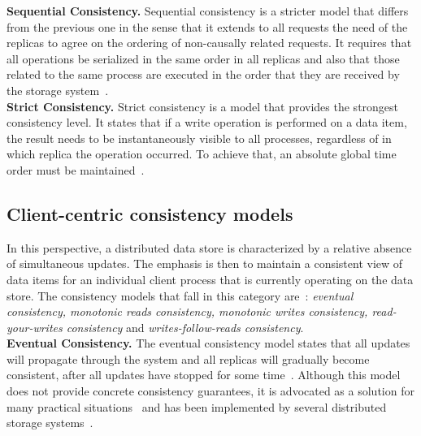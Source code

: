 \noindent \textbf{Sequential Consistency.}
Sequential consistency is a stricter model that differs from the previous one in the sense that it extends to all requests the need of the replicas to agree on the ordering of non-causally related requests. It requires  that all operations be serialized in the same order in all replicas and also that those related to the same process are executed in the order that they are received by the storage system~\cite{tanenbaum:2007}. \\

\noindent \textbf{Strict Consistency.}
Strict consistency is a mod\-el that provides the strongest consistency level. It states that if a write operation is performed on a data item, the result needs to be instantaneously visible to all processes, regardless of in which replica the operation occurred. To achieve that, an absolute global time order must be maintained~\cite{tanenbaum:2007}.

\subsection{Client-centric consistency models}

In this perspective, a distributed data store is characterized by a relative absence of simultaneous updates.
The emphasis is then to maintain a consistent view of data items for an individual client process that is currently operating on the data store. 
The consistency models that fall in this category are~\cite{tanenbaum:2007}: \textit{eventual consistency, monotonic reads consistency, monotonic writes consistency, read-your-writes consistency} and \textit{writes-follow-reads consistency}. \\

\noindent \textbf{Eventual Consistency.}
The eventual consistency mod\-el states that all updates will propagate through the system and all replicas will gradually become consistent, after all updates have stopped for some time~\cite{tanenbaum:2007, Vogels:2009}. Although this model does not provide concrete consistency guarantees, it is {\al advocated  as a solution for many practical situations~\cite{BailisVFHS12,BailisVFHS14,Chihoub2014,Vogels:2009} and has been} implemented by several distributed storage systems~\cite{Chang06bigtable:a, decandia2007dynamo, Ghemawat2003Google, lakshman2010cassandra}. \\

